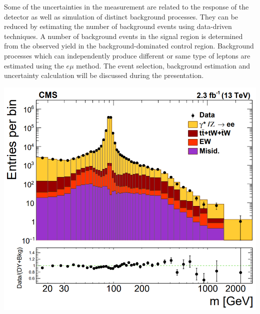 \documentclass[a4paper,10pt,english]{article}
\begin{document}
Some of the uncertainties in the measurement are related to the response of the detector as well as simulation of
distinct background processes.
They can be reduced by estimating the number of background events using data-driven techniques.
A number of background events in the signal region is determined from the observed yield in the background-dominated
control region.
Background processes which can independently produce different or same type of leptons are estimated using the $e\mu$ method.
The event selection, background estimation and uncertainty calculation will be discussed during the presentation.

\vspace{0.3cm}
\centering
\begin{minipage}{0.49\textwidth}
	\begin{center}
		\includegraphics[width=.96\linewidth]{Figure1.png}
	\end{center}
\end{minipage}
\hfill
\end{document}
